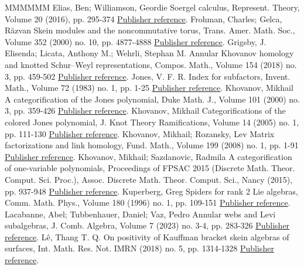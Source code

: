 \documentclass[11pt]{article}
\theoremstyle{definition}
\numberwithin{equation}{section}
\begin{document}
\begin{thebibliography}{MMMMMM}
 Elias, Ben; Williamson, Geordie Soergel calculus, Represent. Theory, Volume 20 (2016), pp. 295-374 \href{https://alco.centre-mersenne.org/articles/10.5802/alco.330/#EW}{Publisher reference}.
 Frohman, Charles; Gelca, Răzvan Skein modules and the noncommutative torus, Trans. Amer. Math. Soc., Volume 352 (2000) no. 10, pp. 4877-4888 \href{https://alco.centre-mersenne.org/articles/10.5802/alco.330/#FG}{Publisher reference}.
 Grigsby, J. Elisenda; Licata, Anthony M.; Wehrli, Stephan M. Annular Khovanov homology and knotted Schur–Weyl representations, Compos. Math., Volume 154 (2018) no. 3, pp. 459-502 \href{https://alco.centre-mersenne.org/articles/10.5802/alco.330/#GLW}{Publisher reference}.
 Jones, V. F. R. Index for subfactors, Invent. Math., Volume 72 (1983) no. 1, pp. 1-25 \href{https://alco.centre-mersenne.org/articles/10.5802/alco.330/#Jon2}{Publisher reference}.
 Khovanov, Mikhail A categorification of the Jones polynomial, Duke Math. J., Volume 101 (2000) no. 3, pp. 359-426 \href{https://alco.centre-mersenne.org/articles/10.5802/alco.330/#Kh1}{Publisher reference}.
 Khovanov, Mikhail Categorifications of the colored Jones polynomial, J. Knot Theory Ramifications, Volume 14 (2005) no. 1, pp. 111-130 \href{https://alco.centre-mersenne.org/articles/10.5802/alco.330/#Kh7}{Publisher reference}.
 Khovanov, Mikhail; Rozansky, Lev Matrix factorizations and link homology, Fund. Math., Volume 199 (2008) no. 1, pp. 1-91 \href{https://alco.centre-mersenne.org/articles/10.5802/alco.330/#KhR}{Publisher reference}.
 Khovanov, Mikhail; Sazdanovic, Radmila A categorification of one-variable polynomials, Proceedings of FPSAC 2015 (Discrete Math. Theor. Comput. Sci. Proc.), Assoc. Discrete Math. Theor. Comput. Sci., Nancy (2015), pp. 937-948 \href{https://alco.centre-mersenne.org/articles/10.5802/alco.330/#KSa}{Publisher reference}.
 Kuperberg, Greg Spiders for rank 2 Lie algebras, Comm. Math. Phys., Volume 180 (1996) no. 1, pp. 109-151 \href{https://alco.centre-mersenne.org/articles/10.5802/alco.330/#Kup}{Publisher reference}.
 Lacabanne, Abel; Tubbenhauer, Daniel; Vaz, Pedro Annular webs and Levi subalgebras, J. Comb. Algebra, Volume 7 (2023) no. 3-4, pp. 283-326 \href{https://alco.centre-mersenne.org/articles/10.5802/alco.330/#LTV}{Publisher reference}.
 Lê, Thang T. Q. On positivity of Kauffman bracket skein algebras of surfaces, Int. Math. Res. Not. IMRN (2018) no. 5, pp. 1314-1328 \href{https://alco.centre-mersenne.org/articles/10.5802/alco.330/#Le}{Publisher reference}.

\end{thebibliography}
\end{document}
